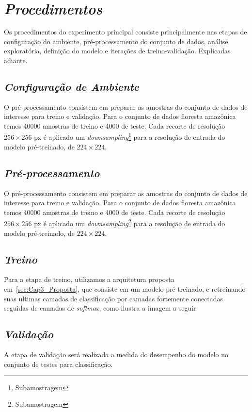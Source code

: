     

\section{\textit{Procedimentos}}\label{sec:Cap3_Procedimentos}

Os procedimentos do experimento principal consiste principalmente nas etapas de configuração do ambiente, pré-processamento do conjunto de dados, análise exploratória, definição do modelo e iterações de treino-validação. Explicadas adiante.

\subsection{\textit{Configuração de Ambiente}}\label{sec:Cap3_PreProcess}
O pré-processamento consistem em preparar as amostras do conjunto de dados de interesse para treino e validação. Para o conjunto de dados floresta amazônica temos 40000 amostras de treino e 4000 de teste. Cada recorte de resolução $256 \times 256$ px é aplicado um \textit{downsampling}\footnote{Subamostragem} para a resolução de entrada do modelo pré-treinado, de $224 \times 224$. 

\subsection{\textit{Pré-processamento}}\label{sec:Cap3_PreProcess}
O pré-processamento consistem em preparar as amostras do conjunto de dados de interesse para treino e validação. Para o conjunto de dados floresta amazônica temos 40000 amostras de treino e 4000 de teste. Cada recorte de resolução $256 \times 256$ px é aplicado um \textit{downsampling}\footnote{Subamostragem} para a resolução de entrada do modelo pré-treinado, de $224 \times 224$. 

\subsection{\textit{Treino}}\label{sec:Cap3_Treino}
Para a etapa de treino, utilizamos a arquitetura proposta em~\ref{sec:Cap3_Proposta}, que consiste em um modelo pré-treinado, e retreinando suas ultimas camadas de classificação por camadas fortemente conectadas seguidas de camadas de \textit{softmax}, como ilustra a imagem a seguir:





\subsection{\textit{Validação}}\label{sec:Cap3_Validacao}

A etapa de validação será realizada a medida do desempenho do modelo no conjunto de testes para classificação.



